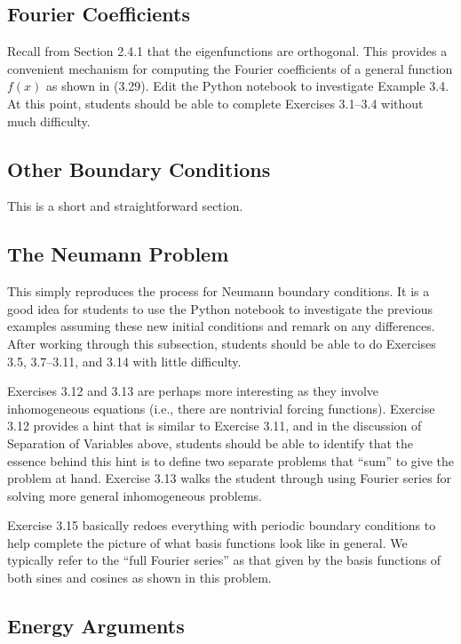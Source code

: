 \documentclass{amsart}
\theoremstyle{plain}
\theoremstyle{definition}
\theoremstyle{remark}
\theoremstyle{definition}
\numberwithin{equation}{section}
\numberwithin{equation}{section}
\begin{document}
\subsection{Fourier Coefficients}

Recall from Section 2.4.1 that the eigenfunctions are orthogonal. 
This provides a convenient mechanism for computing the Fourier coefficients of a general function $f(x)$ as shown in (3.29).
Edit the Python notebook to investigate Example 3.4.
At this point, students should be able to complete Exercises 3.1--3.4 without much difficulty. 


\subsection{Other Boundary Conditions}

This is a short and straightforward section.

\subsection{The Neumann Problem}

This simply reproduces the process for Neumann boundary conditions.
It is a good idea for students to use the Python notebook to investigate the previous examples assuming these new initial conditions and remark on any differences. 
After working through this subsection, students should be able to do Exercises 3.5, 3.7--3.11, and 3.14 with little difficulty.

Exercises 3.12 and 3.13 are perhaps more interesting as they involve inhomogeneous equations (i.e., there are nontrivial forcing functions). 
Exercise 3.12 provides a hint that is similar to Exercise 3.11, and in the discussion of Separation of Variables above, students should be able to identify that the essence behind this hint is to define two separate problems that ``sum'' to give the problem at hand.
Exercise 3.13 walks the student through using Fourier series for solving more general inhomogeneous problems. 

Exercise 3.15 basically redoes everything with periodic boundary conditions to help complete the picture of what basis functions look like in general.
We typically refer to the ``full Fourier series'' as that given by the basis functions of both sines and cosines as shown in this problem.

\subsection{Energy Arguments}
\end{document}
